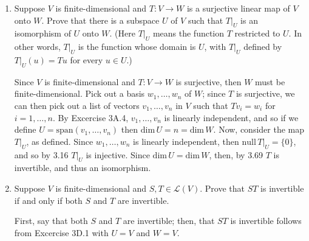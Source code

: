 \documentclass{book}
\begin{document}
\begin{enumerate}
(b) Consider the matrix of any \(T \in E\) with a basis including \(v\).  The column corresponding to \(v\) must consist of zeros, but the other matrix entries - of which there are \((\textrm{dim} \, V - 1)(\textrm{dim} \, W)\) - can be any element of \(\textbf{F}\).  Thus, the dimension of the subspace of \(\textbf{F}^{m,n}\) corresponding (by 3.60) to \(E\) will be equal to \( (\textrm{dim} \, V - 1)(\textrm{dim} \, W)\), meaning that \(\textrm{dim} \, E = (\textrm{dim} \, V - 1)(\textrm{dim} \, W)\).

\item Suppose \(V\) is finite-dimensional and \(T:V \rightarrow W\) is a surjective linear map of \(V\) onto \(W\).  Prove that there is a subspace \(U\) of \(V\) such that \(T|_U\) is an isomorphism of \(U\) onto \(W\).  (Here \(T|_U\) means the function \(T\) restricted to \(U\).  In other words, \(T|_U\) is the function whose domain is \(U\), with \(T|_U\) defined by \(T|_U(u)=Tu\) for every \(u \in U\).)

Since \(V\) is finite-dimensional and \(T:V \rightarrow W\) is surjective, then \(W\) must be finite-dimensional.  Pick out a basis \(w_1,\dots,w_n\) of \(W\); since \(T\) is surjective, we can then pick out a list of vectors \(v_1,\dots,v_n\) in \(V\) such that \(Tv_i=w_i\) for \(i=1,\dots,n\). By Excercise 3A.4, \(v_1,\dots,v_n\) is linearly independent, and so if we define \(U=\textrm{span}(v_1,\dots,v_n)\) then \(\textrm{dim} \, U=n=\textrm{dim} \, W\).  Now, consider the map \(T|_U\), as defined.  Since \(w_1,\dots,w_n\) is linearly independent, then \(\textrm{null} \, T|_U = \{0\}\), and so by 3.16 \(T|_U\) is injective.  Since \(\textrm{dim} \, U=\textrm{dim} \, W\), then, by 3.69 \(T\) is invertible, and thus an isomorphism.

\item Suppose \(V\) is finite-dimensional and \(S,T \in \mathcal{L}(V)\).  Prove that \(ST\) is invertible if and only if both \(S\) and \(T\) are invertible.

First, say that both \(S\) and \(T\) are invertible; then, that \(ST\) is invertible follows from Excercise 3D.1 with \(U=V\) and \(W=V\).


\end{enumerate}
\end{document}
